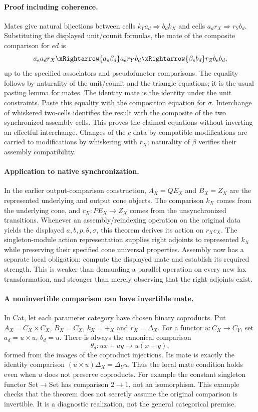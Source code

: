 \documentclass{article}
\begin{document}
\paragraph{Proof including coherence.} Mates give natural bijections between cells $k_Ya_d\Rightarrow b_dk_X$ and cells $a_dr_X\Rightarrow r_Yb_d$. Substituting the displayed unit/counit formulas, the mate of the composite comparison for $e d$ is
\[
 a_ea_dr_X\xRightarrow{a_e\beta_d}a_er_Yb_d
 \xRightarrow{\beta_e b_d}r_Zb_eb_d,
\]
up to the specified associators and pseudofunctor comparisons. The equality follows by naturality of the unit/counit and the triangle equations; it is the usual pasting lemma for mates. The identity mate is the identity under the unit constraints. Paste this equality with the composition equation for $\sigma$. Interchange of whiskered two-cells identifies the result with the composite of the two synchronized assembly cells. This proves the claimed equations without inverting an effectful interchange. Changes of the $c$ data by compatible modifications are carried to modifications by whiskering with $r_X$; naturality of $\beta$ verifies their assembly compatibility.

\paragraph{Application to native synchronization.} In the earlier output-comparison construction, $A_X=QE_X$ and $B_X=Z_X$ are the represented underlying and output cone objects. The comparison $k_X$ comes from the underlying cone, and $c_X:PE_X\to Z_X$ comes from the unsynchronized transitions. Whenever an assembly/reindexing operation on the original data yields the displayed $a,b,p,\theta,\sigma$, this theorem derives its action on $r_Xc_X$. The singleton-module action representation supplies right adjoints to represented $k_X$ while preserving their specified cone universal properties. Assembly now has a separate local obligation: compute the displayed mate and establish its required strength. This is weaker than demanding a parallel operation on every new lax transformation, and stronger than merely observing that the right adjoints exist.

\paragraph{A noninvertible comparison can have invertible mate.} In Cat, let each parameter category have chosen binary coproducts. Put $A_X=C_X\times C_X$, $B_X=C_X$, $k_X=+_X$ and $r_X=\Delta_X$. For a functor $u:C_X\to C_Y$, set $a_d=u\times u$, $b_d=u$. There is always the canonical comparison
\[
 \theta_d:u x+u y\longrightarrow u(x+y),
\]
formed from the images of the coproduct injections. Its mate is exactly the identity comparison $(u\times u)\Delta_X=\Delta_Yu$. Thus the local mate condition holds even when $u$ does not preserve coproducts. For example the constant singleton functor Set$\to$Set has comparison $2\to1$, not an isomorphism. This example checks that the theorem does not secretly assume the original comparison is invertible. It is a diagnostic realization, not the general categorical premise.
\end{document}
